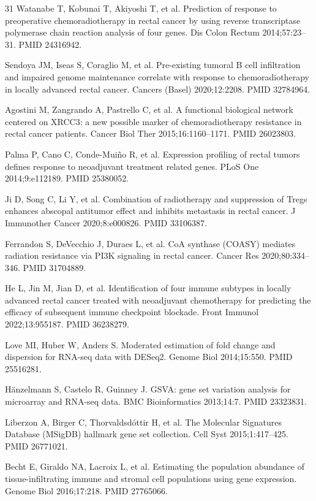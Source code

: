 \documentclass[11pt,a4paper]{article}
\begin{document}
\begin{thebibliography}{31}
 Watanabe T, Kobunai T, Akiyoshi T, et al. Prediction of response to preoperative chemoradiotherapy in rectal cancer by using reverse transcriptase polymerase chain reaction analysis of four genes. Dis Colon Rectum 2014;57:23--31. PMID 24316942.

 Sendoya JM, Iseas S, Coraglio M, et al. Pre-existing tumoral B cell infiltration and impaired genome maintenance correlate with response to chemoradiotherapy in locally advanced rectal cancer. Cancers (Basel) 2020;12:2208. PMID 32784964.

 Agostini M, Zangrando A, Pastrello C, et al. A functional biological network centered on XRCC3: a new possible marker of chemoradiotherapy resistance in rectal cancer patients. Cancer Biol Ther 2015;16:1160--1171. PMID 26023803.

 Palma P, Cano C, Conde-Mui\~no R, et al. Expression profiling of rectal tumors defines response to neoadjuvant treatment related genes. PLoS One 2014;9:e112189. PMID 25380052.

 Ji D, Song C, Li Y, et al. Combination of radiotherapy and suppression of Tregs enhances abscopal antitumor effect and inhibits metastasis in rectal cancer. J Immunother Cancer 2020;8:e000826. PMID 33106387.

 Ferrandon S, DeVecchio J, Duraes L, et al. CoA synthase (COASY) mediates radiation resistance via PI3K signaling in rectal cancer. Cancer Res 2020;80:334--346. PMID 31704889.

 He L, Jin M, Jian D, et al. Identification of four immune subtypes in locally advanced rectal cancer treated with neoadjuvant chemotherapy for predicting the efficacy of subsequent immune checkpoint blockade. Front Immunol 2022;13:955187. PMID 36238279.

 Love MI, Huber W, Anders S. Moderated estimation of fold change and dispersion for RNA-seq data with DESeq2. Genome Biol 2014;15:550. PMID 25516281.

 H\"anzelmann S, Castelo R, Guinney J. GSVA: gene set variation analysis for microarray and RNA-seq data. BMC Bioinformatics 2013;14:7. PMID 23323831.

 Liberzon A, Birger C, Thorvaldsd\'ottir H, et al. The Molecular Signatures Database (MSigDB) hallmark gene set collection. Cell Syst 2015;1:417--425. PMID 26771021.

 Becht E, Giraldo NA, Lacroix L, et al. Estimating the population abundance of tissue-infiltrating immune and stromal cell populations using gene expression. Genome Biol 2016;17:218. PMID 27765066.


\end{thebibliography}
\end{document}
